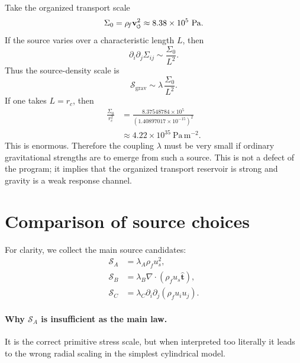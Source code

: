 \documentclass[11pt]{article}
\newcommand{\swirlarrow}{\mathchoice{\mkern-2mu\scriptstyle\boldsymbol{\circlearrowleft}}{\mkern-2mu\scriptstyle\boldsymbol{\circlearrowleft}}{\mkern-2mu\scriptscriptstyle\boldsymbol{\circlearrowleft}}{\mkern-2mu\scriptscriptstyle\boldsymbol{\circlearrowleft}}}
\newcommand{\vswirl}{\mathbf{v}_{\swirlarrow}}
\newcommand{\rhoF}{\rho_{\!f}}
\newcommand{\rc}{r_c}
\newcommand{\grav}{\mathrm{grav}}
\begin{document}
        Take the organized transport scale
        \[
            \Sigma_0 = \rhoF \vswirl^2 \approx 8.38\times 10^5\ \mathrm{Pa}.
        \]
        If the source varies over a characteristic length \(L\), then
        \begin{equation}
            \partial_i\partial_j \Sigma_{ij}
            \sim
            \frac{\Sigma_0}{L^2}.
            \label{eq:source-scaling}
        \end{equation}
        Thus the source-density scale is
        \begin{equation}
            \mathcal{S}_{\grav}
            \sim
            \lambda\, \frac{\Sigma_0}{L^2}.
            \label{eq:Sgrav-scale}
        \end{equation}
        If one takes \(L=\rc\), then
        \begin{align}
            \frac{\Sigma_0}{\rc^2}
            &=
            \frac{8.37548784\times 10^5}{(1.40897017\times 10^{-15})^2}
            \\
            &\approx
            4.22\times 10^{35}\ \mathrm{Pa\,m^{-2}}.
            \label{eq:source-scale-numeric}
        \end{align}
        This is enormous. Therefore the coupling \(\lambda\) must be very small if ordinary gravitational strengths are to emerge from such a source. This is not a defect of the program; it implies that the organized transport reservoir is strong and gravity is a weak response channel.
        
        \section{Comparison of source choices}
        
        For clarity, we collect the main source candidates:
        \begin{align}
            \mathcal{S}_A &= \lambda_A \rhoF u_s^2,
            \label{eq:compare-A}
            \\
            \mathcal{S}_B &= \lambda_B \nabla\cdot(\rhoF u_s \hat{\mathbf t}),
            \label{eq:compare-B}
            \\
            \mathcal{S}_C &= \lambda_C \partial_i\partial_j(\rhoF u_i u_j).
            \label{eq:compare-C}
        \end{align}
        
        \paragraph{Why \(\mathcal{S}_A\) is insufficient as the main law.}
            It is the correct primitive stress scale, but when interpreted too literally it leads to the wrong radial scaling in the simplest cylindrical model.
        
\end{document}
